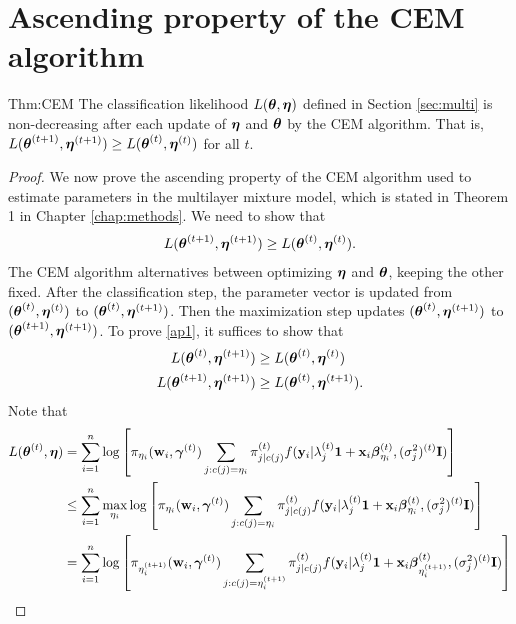 \chapter{Ascending property of the CEM algorithm}
\label{append:2}

\begin{reptheorem}{Thm:CEM}
The classification likelihood $L(\boldsymbol\theta,\boldsymbol\eta)$ defined in Section \ref{sec:multi} is non-decreasing after each update of $\boldsymbol\eta$ and $\boldsymbol\theta$ by the CEM algorithm. That is, $L(\boldsymbol\theta^{(t+1)},\boldsymbol\eta^{(t+1)}) \geq L(\boldsymbol\theta^{(t)},\boldsymbol\eta^{(t)})$ for all $t$.
\end{reptheorem}

\begin{proof}
We now prove the ascending property of the CEM algorithm used to estimate parameters in the multilayer mixture model, which is stated in Theorem 1 in Chapter \ref{chap:methods}. We need to show that
    \begin{align}\label{ap1}L(\boldsymbol\theta^{(t+1)},\boldsymbol\eta^{(t+1)})\geq L(\boldsymbol\theta^{(t)},\boldsymbol\eta^{(t)}).\end{align}
    The CEM algorithm alternatives between optimizing $\boldsymbol\eta$ and $\boldsymbol\theta$, keeping the other fixed. After the classification step, the parameter vector is updated from $(\boldsymbol\theta^{(t)},\boldsymbol\eta^{(t)})$ to $(\boldsymbol\theta^{(t)},\boldsymbol\eta^{(t+1)})$. Then the maximization step updates $(\boldsymbol\theta^{(t)},\boldsymbol\eta^{(t+1)})$ to $(\boldsymbol\theta^{(t+1)},\boldsymbol\eta^{(t+1)})$. To prove \ref{ap1}, it suffices to show that
    \begin{align*}
    L(\boldsymbol\theta^{(t)},\boldsymbol\eta^{(t+1)})&\geq L(\boldsymbol\theta^{(t)},\boldsymbol\eta^{(t)})\\
    L(\boldsymbol\theta^{(t+1)},\boldsymbol\eta^{(t+1)})&\geq L(\boldsymbol\theta^{(t)},\boldsymbol\eta^{(t+1)}).
    \end{align*}
    Note that 
    \begin{align*}
 L(\BS\theta^{(t)},\BS\eta)&=\sum^{n}_{i=1}\log\left[\pi_{\eta_{i}}(\B w_{i},\BS \gamma^{(t)})\sum_{j:c(j)=\eta_{i}}\pi_{j|c(j)}^{(t)}f(\B y_{i}|\lambda_{j}^{(t)}\B 1+\B x_{i}\BS\beta^{(t)}_{\eta_{i}},(\sigma^{2}_{j})^{(t)}\B I)\right]\\
 &\leq \sum^{n}_{i=1}\max_{\eta_{i}}\log\left[\pi_{\eta_{i}}(\B w_{i},\BS \gamma^{(t)})\sum_{j:c(j)=\eta_{i}}\pi_{j|c(j)}^{(t)}f(\B y_{i}|\lambda_{j}^{(t)}\B 1+\B x_{i}\BS\beta^{(t)}_{\eta_{i}},(\sigma^{2}_{j})^{(t)}\B I)\right]\\
  &= \sum^{n}_{i=1}\log\left[\pi_{\eta^{(t+1)}_{i}}(\B w_{i},\BS \gamma^{(t)})\sum_{j:c(j)=\eta^{(t+1)}_{i}}\pi_{j|c(j)}^{(t)}f(\B y_{i}|\lambda_{j}^{(t)}\B 1+\B x_{i}\BS\beta^{(t)}_{\eta^{(t+1)}_{i}},(\sigma^{2}_{j})^{(t)}\B I)\right]\\

\end{align*}
\end{proof}
